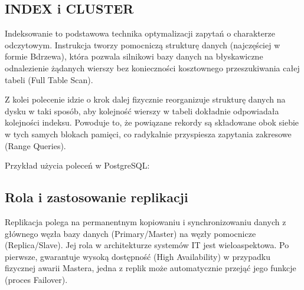 \documentclass[a4paper,11pt,english,openany,oneside]{sphinxmanual}
\begin{document}
\subsection{INDEX i CLUSTER}
\label{\detokenize{rozdzial_2/rozdzial_25/index:index-i-cluster}}
\sphinxAtStartPar
Indeksowanie to podstawowa technika optymalizacji zapytań o charakterze odczytowym. Instrukcja  tworzy pomocniczą strukturę danych (najczęściej w formie B\sphinxhyphen{}drzewa), która pozwala silnikowi bazy danych na błyskawiczne odnalezienie żądanych wierszy bez konieczności kosztownego przeszukiwania całej tabeli (Full Table Scan).

\sphinxAtStartPar
Z kolei polecenie  idzie o krok dalej \textendash{} fizycznie reorganizuje strukturę danych na dysku w taki sposób, aby kolejność wierszy w tabeli dokładnie odpowiadała kolejności indeksu. Powoduje to, że powiązane rekordy są składowane obok siebie w tych samych blokach pamięci, co radykalnie przyspiesza zapytania zakresowe (Range Queries).

\sphinxAtStartPar
Przykład użycia poleceń w PostgreSQL:

\begin{sphinxVerbatim}[commandchars=\\\{\}]

\end{sphinxVerbatim}


\subsection{Rola i zastosowanie replikacji}
\label{\detokenize{rozdzial_2/rozdzial_25/index:rola-i-zastosowanie-replikacji}}
\sphinxAtStartPar
Replikacja polega na permanentnym kopiowaniu i synchronizowaniu danych z głównego węzła bazy danych (Primary/Master) na węzły pomocnicze (Replica/Slave). Jej rola w architekturze systemów IT jest wieloaspektowa. Po pierwsze, gwarantuje wysoką dostępność (High Availability) \textendash{} w przypadku fizycznej awarii Mastera, jedna z replik może automatycznie przejąć jego funkcje (proces Failover).
\end{document}
